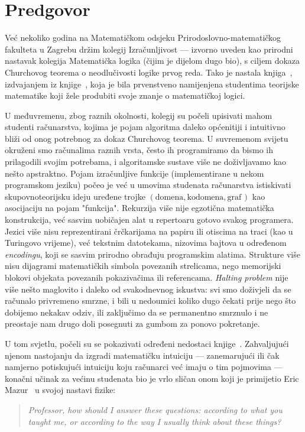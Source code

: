 \chapter[]{Predgovor}


Već nekoliko godina na Matematičkom odsjeku Prirodoslovno-matematičkog fakulteta u Zagrebu držim kolegij Izračunljivost --- izvorno uveden kao prirodni nastavak kolegija Matematička logika (čijim je dijelom dugo bio), s ciljem dokaza Churchovog teorema o neodlučivosti logike prvog reda. Tako je nastala knjiga~\cite{skr:Vuk}, izdvajanjem iz knjige~\cite{skr:VukML}, koja je bila prvenstveno namijenjena studentima teorijske matematike koji žele produbiti svoje znanje o matematičkoj logici.

U međuvremenu, zbog raznih okolnosti, kolegij su počeli upisivati mahom studenti računarstva, kojima je pojam algoritma daleko općenitiji i intuitivno bliži od onog potrebnog za dokaz Churchovog teorema. U suvremenom svijetu okruženi smo računalima raznih vrsta, često ih programiramo da bismo ih prilagodili svojim potrebama, i algoritamske sustave više ne doživljavamo kao nešto apstraktno. Pojam izračunljive funkcije (implementirane u nekom programskom jeziku) počeo je već u umovima studenata računarstva istiskivati skupovnoteorijsku ideju uređene trojke $(\text{domena},\text{kodomena},\text{graf}\mspace{2mu})$ kao asocijaciju na pojam "funkcija". Rekurzija više nije egzotična matematička konstrukcija, već sasvim uobičajen alat u repertoaru gotovo svakog programera. Jezici više nisu reprezentirani črčkarijama na papiru ili otiscima na traci (kao u Turingovo vrijeme), već tekstnim datotekama, nizovima bajtova u određenom \emph{encodingu}, koji se sasvim prirodno obrađuju programskim alatima. Strukture više nisu dijagrami matematičkih simbola povezanih strelicama, nego memorijski blokovi objekata povezanih pokazivačima ili referencama. \emph{Halting problem} nije više nešto maglovito i daleko od svakodnevnog iskustva: svi smo doživjeli da se računalo privremeno smrzne, i bili u nedoumici koliko dugo čekati prije nego što dobijemo nekakav odziv\!, ili zaključimo da se permanentno smrznulo i ne preostaje nam drugo doli posegnuti za gumbom za ponovo pokretanje. 

U tom svjetlu, počeli su se pokazivati određeni nedostaci knjige~\cite{skr:Vuk}. Zahvaljujući njenom nastojanju da izgradi matematičku intuiciju --- zanemarujući ili čak namjerno potiskujući intuiciju koju računarci već imaju o tim pojmovima --- konačni učinak za većinu studenata bio je vrlo sličan onom koji je primijetio Eric Mazur~\cite{mazur} u svojoj nastavi fizike:
\begin{quote}
    \emph{Professor, how should I answer these questions: according to what you \\ taught me, or according to the way I usually think about these things?}
\end{quote}

